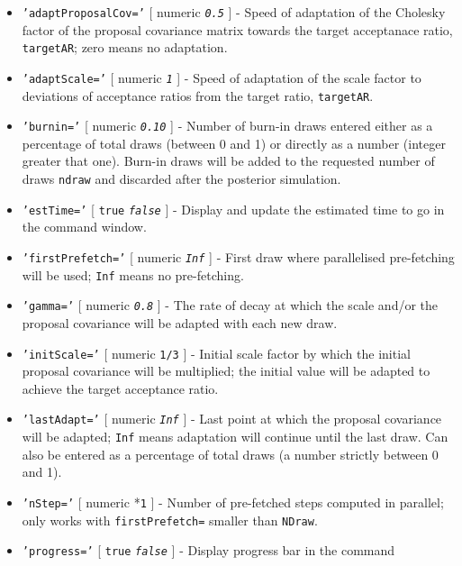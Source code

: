 \begin{itemize}
\item
  \texttt{'adaptProposalCov='} {[} numeric \textbar{}
  \emph{\texttt{0.5}} {]} - Speed of adaptation of the Cholesky factor
  of the proposal covariance matrix towards the target acceptanace
  ratio, \texttt{targetAR}; zero means no adaptation.
\item
  \texttt{'adaptScale='} {[} numeric \textbar{} \emph{\texttt{1}} {]} -
  Speed of adaptation of the scale factor to deviations of acceptance
  ratios from the target ratio, \texttt{targetAR}.
\item
  \texttt{'burnin='} {[} numeric \textbar{} \emph{\texttt{0.10}} {]} -
  Number of burn-in draws entered either as a percentage of total draws
  (between 0 and 1) or directly as a number (integer greater that one).
  Burn-in draws will be added to the requested number of draws
  \texttt{ndraw} and discarded after the posterior simulation.
\item
  \texttt{'estTime='} {[} \texttt{true} \textbar{} \emph{\texttt{false}}
  {]} - Display and update the estimated time to go in the command
  window.
\item
  \texttt{'firstPrefetch='} {[} numeric \textbar{} \emph{\texttt{Inf}}
  {]} - First draw where parallelised pre-fetching will be used;
  \texttt{Inf} means no pre-fetching.
\item
  \texttt{'gamma='} {[} numeric \textbar{} \emph{\texttt{0.8}} {]} - The
  rate of decay at which the scale and/or the proposal covariance will
  be adapted with each new draw.
\item
  \texttt{'initScale='} {[} numeric \textbar{} \texttt{1/3} {]} -
  Initial scale factor by which the initial proposal covariance will be
  multiplied; the initial value will be adapted to achieve the target
  acceptance ratio.
\item
  \texttt{'lastAdapt='} {[} numeric \textbar{} \emph{\texttt{Inf}} {]} -
  Last point at which the proposal covariance will be adapted;
  \texttt{Inf} means adaptation will continue until the last draw. Can
  also be entered as a percentage of total draws (a number strictly
  between 0 and 1).
\item
  \texttt{'nStep='} {[} numeric \textbar{} *\texttt{1} {]} - Number of
  pre-fetched steps computed in parallel; only works with
  \texttt{firstPrefetch=} smaller than \texttt{NDraw}.
\item
  \texttt{'progress='} {[} \texttt{true} \textbar{}
  \emph{\texttt{false}} {]} - Display progress bar in the command

\end{itemize}
